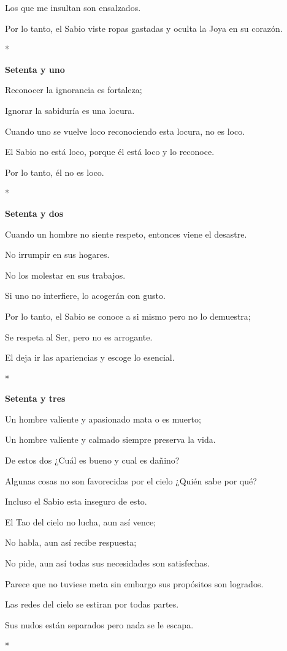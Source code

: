 Los que me insultan son ensalzados.

Por lo tanto, el Sabio viste ropas gastadas y oculta la Joya en su
corazón.

*

\textbf{Setenta y uno}

Reconocer la ignorancia es fortaleza;

Ignorar la sabiduría es una locura.

Cuando uno se vuelve loco reconociendo esta locura, no es loco.

El Sabio no está loco, porque él está loco y lo reconoce.

Por lo tanto, él no es loco.

*

\textbf{Setenta y dos}

Cuando un hombre no siente respeto, entonces viene el desastre.

No irrumpir en sus hogares.

No los molestar en sus trabajos.

Si uno no interfiere, lo acogerán con gusto.

Por lo tanto, el Sabio se conoce a si mismo pero no lo demuestra;

Se respeta al Ser, pero no es arrogante.

El deja ir las apariencias y escoge lo esencial.

*

\textbf{Setenta y tres}

Un hombre valiente y apasionado mata o es muerto;

Un hombre valiente y calmado siempre preserva la vida.

De estos dos ¿Cuál es bueno y cual es dañino?

Algunas cosas no son favorecidas por el cielo ¿Quién sabe por qué?

Incluso el Sabio esta inseguro de esto.

El Tao del cielo no lucha, aun así vence;

No habla, aun así recibe respuesta;

No pide, aun así todas sus necesidades son satisfechas.

Parece que no tuviese meta sin embargo sus propósitos son logrados.

Las redes del cielo se estiran por todas partes.

Sus nudos están separados pero nada se le escapa.

*

